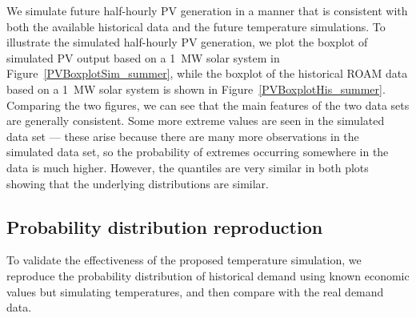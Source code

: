 \documentclass[11pt]{article}
\begin{document}


We simulate future half-hourly PV generation in a manner that is consistent with both the available historical data and the future temperature simulations.
To illustrate the simulated half-hourly PV generation, we plot the boxplot of simulated PV output based on a 1~MW solar system in Figure~\ref{PVBoxplotSim_summer}, while the boxplot of the historical ROAM data based on a 1~MW solar system is shown in Figure~\ref{PVBoxplotHis_summer}. Comparing the two figures, we can see that the main features of the two data sets are generally consistent. Some more extreme values are seen in the simulated data set --- these arise because there are many more observations in the simulated data set, so the probability of extremes occurring somewhere in the data is much higher. However, the quantiles are very similar in both plots showing that the underlying distributions are similar.




\subsection{Probability distribution reproduction}

To validate the effectiveness of the proposed temperature simulation, we reproduce the probability distribution of historical demand using known economic values but simulating temperatures, and then compare with the real demand data.


\end{document}
